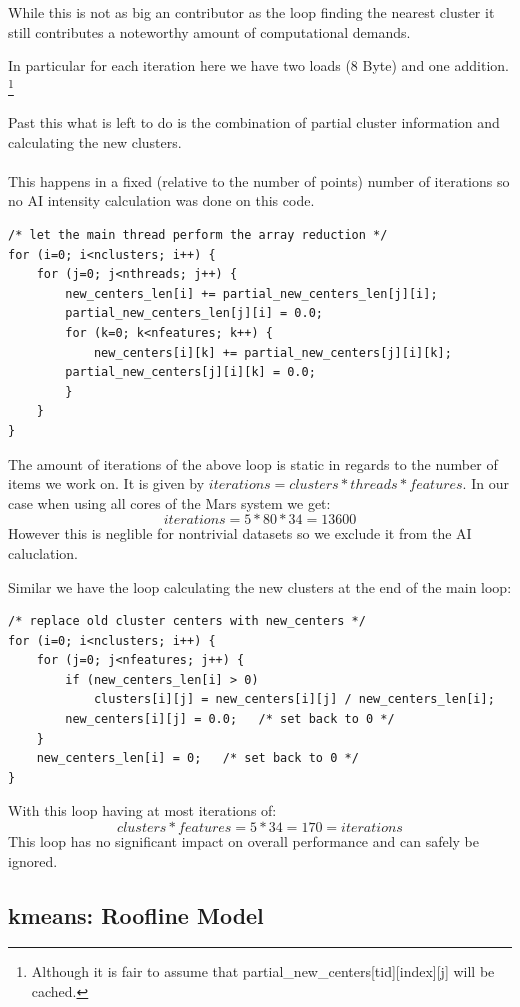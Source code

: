 While this is not as big an contributor as the loop finding the nearest cluster
it still contributes a noteworthy amount of computational demands.

In particular for each iteration here we have two loads (8 Byte) and one addition.
\footnote{Although it is fair to assume that partial\_new\_centers[tid][index][j] will be cached.}

Past this what is left to do is the combination of partial cluster information and calculating the new clusters.

\paragraph{} This happens in a fixed (relative to the number of points) number of iterations so no AI intensity calculation was done on this code.


\begin{lstlisting}[caption={Reduction pt1}]
/* let the main thread perform the array reduction */
for (i=0; i<nclusters; i++) {
	for (j=0; j<nthreads; j++) {
		new_centers_len[i] += partial_new_centers_len[j][i];
		partial_new_centers_len[j][i] = 0.0;
		for (k=0; k<nfeatures; k++) {
			new_centers[i][k] += partial_new_centers[j][i][k];
		partial_new_centers[j][i][k] = 0.0;
		}
	}
}
\end{lstlisting}

The amount of iterations of the above loop is static in regards to the number of items we work on.
It is given by $ iterations = clusters * threads * features$.
In our case when using all cores of the Mars system we get: 
$$ iterations = 5 * 80  * 34 = 13600$$
However this is neglible for nontrivial datasets so we exclude it from the AI caluclation.

Similar we have the loop calculating the new clusters at the end of the main loop:
\begin{lstlisting}[caption={Reduction pt2}]
/* replace old cluster centers with new_centers */
for (i=0; i<nclusters; i++) {
	for (j=0; j<nfeatures; j++) {
		if (new_centers_len[i] > 0)
			clusters[i][j] = new_centers[i][j] / new_centers_len[i];
		new_centers[i][j] = 0.0;   /* set back to 0 */
	}
	new_centers_len[i] = 0;   /* set back to 0 */
}
\end{lstlisting}
With this loop having at most iterations of:
$$clusters * features = 5 * 34 = 170 = iterations$$ 
This loop has no significant impact on overall performance and can safely be ignored.

\subsection{kmeans: Roofline Model}

